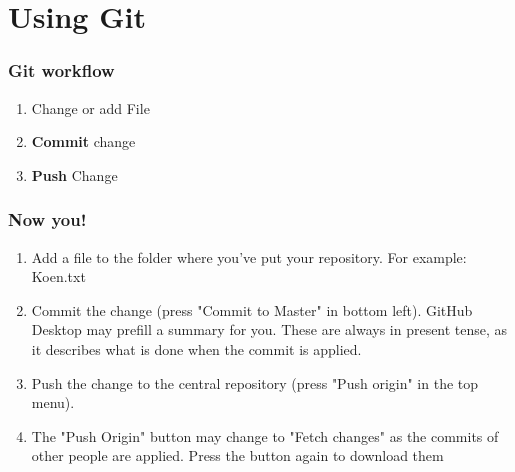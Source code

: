 \documentclass{beamer}
\begin{document}
\section{Using Git} %
\begin{frame}

\frametitle{Git workflow}
\begin{enumerate}
  \item<1-> Change or add File
  \item<1-> \textbf{Commit} change
  \item<1-> \textbf{Push} Change
\end{enumerate}
\end{frame}


\begin{frame}
\frametitle{Now you!}
\begin{enumerate}
  \item Add a file to the folder where you've put your repository. For example: Koen.txt
  \item Commit the change (press "Commit to Master" in bottom left). GitHub Desktop may prefill a summary for you. 
  		These are always in present tense, as it describes what is done when the commit is applied.
  \item Push the change to the central repository (press "Push origin" in the top menu).
  \item The "Push Origin" button may change to "Fetch changes" as the commits of other people are applied. 
  		Press the button again to download them
\end{enumerate}
\end{frame}
\end{document}
